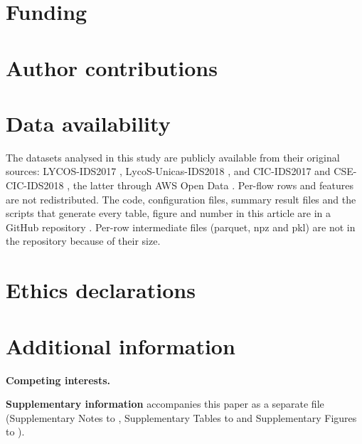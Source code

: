 \section*{Funding}
\fundingStatement

\section*{Author contributions}
\contributionsStatement

\section*{Data availability}
\label{sec:data}
The datasets analysed in this study are publicly available from their original sources: LYCOS-IDS2017
\cite{rosay2021,rosay2022}, LycoS-Unicas-IDS2018 \cite{cantone2024}, and CIC-IDS2017 and CSE-CIC-IDS2018
\cite{sharafaldin2018}, the latter through AWS Open Data \cite{aws_cse_cic_ids2018}.
Per-flow rows and features are not redistributed.
The code, configuration files, summary result files and the scripts that generate every table, figure and number in
this article are in a GitHub repository \cite{repo_attn_nids}.
\repositoryStatus{}
Per-row intermediate files (parquet, npz and pkl) are not in the repository because of their size.

\ifethics
\section*{Ethics declarations}
\ethicsStatement
\fi

\section*{Additional information}
\textbf{Competing interests.} \competingStatement

\textbf{Supplementary information} accompanies this paper as a separate file (Supplementary Notes
\suppNoteImpl{} to \suppNoteLimits, Supplementary Tables \suppTabData{} to \suppTabRuns{} and Supplementary Figures
\suppFigMassRatio{} to \suppFigPerClass).
